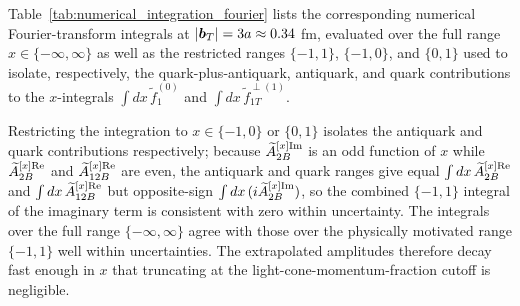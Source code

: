 Table~\ref{tab:numerical_integration_fourier} lists the corresponding numerical Fourier-transform integrals at $|\vect{b}_T|=3a\approx0.34$ fm, evaluated over the full range $x\in\{-\infty,\infty\}$ as well as the restricted ranges $\{-1,1\}$, $\{-1,0\}$, and $\{0,1\}$ used to isolate, respectively, the quark-plus-antiquark, antiquark, and quark contributions to the $x$-integrals $\int dx\,\tilde f_1^{(0)}$ and $\int dx\,\tilde f_{1T}^{\perp(1)}$.

\begin{table}[H]
\centering
\renewcommand{\arraystretch}{1.8}
\caption{Numerical integration of the Fourier transforms at $|\vect{b}_T| = 3a \approx 0.34$ fm, evaluated using the extrapolated ($\hat\zeta\to\infty$) amplitudes of Fig.~\ref{fig:extrapolated_amplitude_level_amps}, over the full range and three restricted $x$-ranges isolating the quark, antiquark, and combined contributions. The first four rows are unrenormalized; the multiplicative renormalization factor cancels only in the fifth row, where the ratio is formed.}
\label{tab:numerical_integration_fourier}
\end{table}


Restricting the integration to $x\in\{-1,0\}$ or $\{0,1\}$ isolates the antiquark and quark contributions respectively; because $\widetilde{A}^{[x]\text{Im}}_{2B}$ is an odd function of $x$ while $\widetilde{A}^{[x]\text{Re}}_{2B}$ and $\widetilde{A}^{[x]\text{Re}}_{12B}$ are even, the antiquark and quark ranges give equal $\int dx\,\widetilde{A}^{[x]\text{Re}}_{2B}$ and $\int dx\,\widetilde{A}^{[x]\text{Re}}_{12B}$ but opposite-sign $\int dx\,(i\widetilde{A}^{[x]\text{Im}}_{2B})$, so the combined $\{-1,1\}$ integral of the imaginary term is consistent with zero within uncertainty. The integrals over the full range $\{-\infty,\infty\}$ agree with those over the physically motivated range $\{-1,1\}$ well within uncertainties. The extrapolated amplitudes therefore decay fast enough in $x$ that truncating at the light-cone-momentum-fraction cutoff is negligible.

